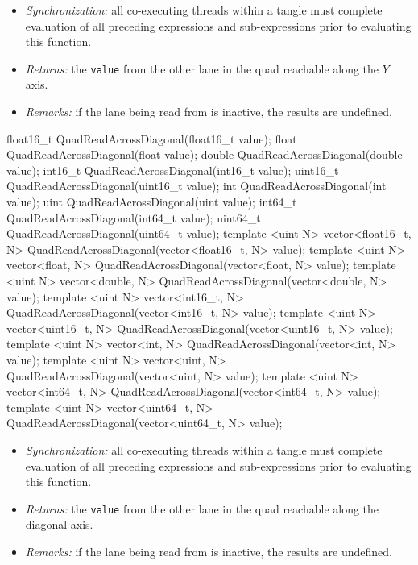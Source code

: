 \begin{itemize}
  \item \textit{Synchronization:} all co-executing threads within a \gls{tangle}
  must complete evaluation of all preceding expressions and sub-expressions
  prior to evaluating this function.
  \item \textit{Returns:} the \texttt{value} from the other \gls{lane} in the
  \gls{quad} reachable along the $Y$ axis.
  \item \textit{Remarks:} if the \gls{lane} being read from is inactive, the
  results are undefined.
\end{itemize}

\begin{HLSL}
float16_t QuadReadAcrossDiagonal(float16_t value);
float QuadReadAcrossDiagonal(float value);
double QuadReadAcrossDiagonal(double value);
int16_t QuadReadAcrossDiagonal(int16_t value);
uint16_t QuadReadAcrossDiagonal(uint16_t value);
int QuadReadAcrossDiagonal(int value);
uint QuadReadAcrossDiagonal(uint value);
int64_t QuadReadAcrossDiagonal(int64_t value);
uint64_t QuadReadAcrossDiagonal(uint64_t value);
template <uint N> vector<float16_t, N> QuadReadAcrossDiagonal(vector<float16_t, N> value);
template <uint N> vector<float, N> QuadReadAcrossDiagonal(vector<float, N> value);
template <uint N> vector<double, N> QuadReadAcrossDiagonal(vector<double, N> value);
template <uint N> vector<int16_t, N> QuadReadAcrossDiagonal(vector<int16_t, N> value);
template <uint N> vector<uint16_t, N> QuadReadAcrossDiagonal(vector<uint16_t, N> value);
template <uint N> vector<int, N> QuadReadAcrossDiagonal(vector<int, N> value);
template <uint N> vector<uint, N> QuadReadAcrossDiagonal(vector<uint, N> value);
template <uint N> vector<int64_t, N> QuadReadAcrossDiagonal(vector<int64_t, N> value);
template <uint N> vector<uint64_t, N> QuadReadAcrossDiagonal(vector<uint64_t, N> value);
\end{HLSL}

\begin{itemize}
  \item \textit{Synchronization:} all co-executing threads within a \gls{tangle}
  must complete evaluation of all preceding expressions and sub-expressions
  prior to evaluating this function.
  \item \textit{Returns:} the \texttt{value} from the other \gls{lane} in the
  \gls{quad} reachable along the diagonal axis.
  \item \textit{Remarks:} if the \gls{lane} being read from is inactive, the
  results are undefined.
\end{itemize}

